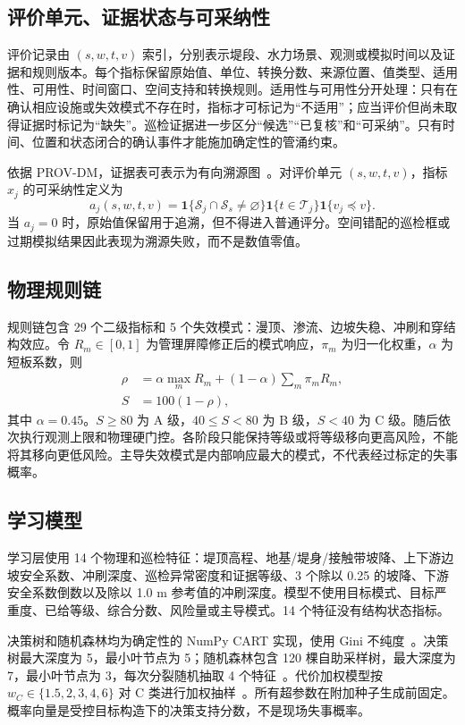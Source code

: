 \documentclass[10pt,twocolumn,a4paper]{ctexart}
\begin{document}
\subsection{评价单元、证据状态与可采纳性}
评价记录由 $(s,w,t,v)$ 索引，分别表示堤段、水力场景、观测或模拟时间以及证据和规则版本。每个指标保留原始值、单位、转换分数、来源位置、值类型、适用性、可用性、时间窗口、空间支持和转换规则。适用性与可用性分开处理：只有在确认相应设施或失效模式不存在时，指标才可标记为“不适用”；应当评价但尚未取得证据时标记为“缺失”。巡检证据进一步区分“候选”“已复核”和“可采纳”。只有时间、位置和状态闭合的确认事件才能施加确定性的管涌约束。

依据 PROV-DM，证据表可表示为有向溯源图~\cite{PROVDM}。对评价单元 $(s,w,t,v)$，指标 $x_j$ 的可采纳性定义为
\begin{equation}
a_j(s,w,t,v)=\mathbf{1}\{\mathcal{S}_j\cap\mathcal{S}_s\neq\varnothing\}\mathbf{1}\{t\in\mathcal{T}_j\}\mathbf{1}\{v_j\preceq v\}.
\label{eq:admissibility}
\end{equation}
当 $a_j=0$ 时，原始值保留用于追溯，但不得进入普通评分。空间错配的巡检框或过期模拟结果因此表现为溯源失败，而不是数值零值。

\subsection{物理规则链}
规则链包含 29 个二级指标和 5 个失效模式：漫顶、渗流、边坡失稳、冲刷和穿结构效应。令 $R_m\in[0,1]$ 为管理屏障修正后的模式响应，$\pi_m$ 为归一化权重，$\alpha$ 为短板系数，则
\begin{align}
\rho&=\alpha\max_mR_m+(1-\alpha)\sum_m\pi_mR_m,\\
S&=100(1-\rho),
\end{align}
其中 $\alpha=0.45$。$S\geq80$ 为 A 级，$40\leq S<80$ 为 B 级，$S<40$ 为 C 级。随后依次执行观测上限和物理硬门控。各阶段只能保持等级或将等级移向更高风险，不能将其移向更低风险。主导失效模式是内部响应最大的模式，不代表经过标定的失事概率。

\subsection{学习模型}
学习层使用 14 个物理和巡检特征：堤顶高程、地基/堤身/接触带坡降、上下游边坡安全系数、冲刷深度、巡检异常密度和证据等级、3 个除以 0.25 的坡降、下游安全系数倒数以及除以 1.0 m 参考值的冲刷深度。模型不使用目标模式、目标严重度、已给等级、综合分数、风险量或主导模式。14 个特征没有结构状态指标。

决策树和随机森林均为确定性的 NumPy CART 实现，使用 Gini 不纯度~\cite{Quinlan,Hastie2009}。决策树最大深度为 5，最小叶节点为 5；随机森林包含 120 棵自助采样树，最大深度为 7，最小叶节点为 3，每次分裂随机抽取 4 个特征~\cite{Breiman}。代价加权模型按 $w_C\in\{1.5,2,3,4,6\}$ 对 C 类进行加权抽样~\cite{Elkan2001}。所有超参数在附加种子生成前固定。概率向量是受控目标构造下的决策支持分数，不是现场失事概率。
\end{document}
